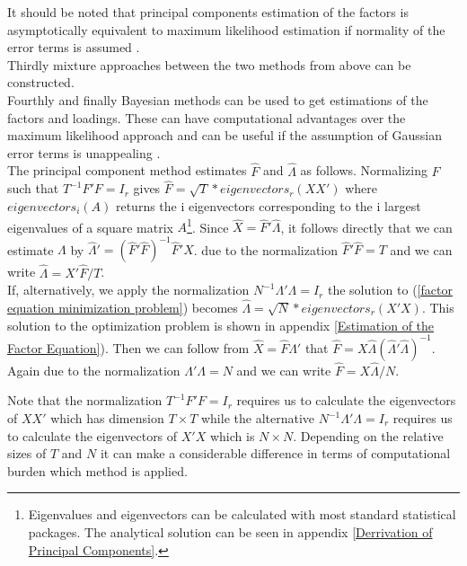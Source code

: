 \documentclass[12pt]{article}
\begin{document}
It should be noted that principal components estimation of the factors is asymptotically equivalent to maximum likelihood estimation if normality of the error terms is assumed \citep{bai2003inferential}. \\
Thirdly mixture approaches between the two methods from above can be constructed. \\
Fourthly and finally Bayesian methods can be used to get estimations of the factors and loadings. These can have computational advantages over the maximum likelihood approach and can be useful if the assumption of Gaussian error terms is unappealing \citep{stock2011dynamic}. \\

The principal component method estimates $\hat F$ and $\hat \Lambda$ as follows. Normalizing $F$ such that $T^{-1}F'F = I_r$ gives $\hat F = \sqrt{T} * eigenvectors_r(XX')$ where $eigenvectors_i(A)$ returns the i eigenvectors corresponding to the i largest eigenvalues of a square matrix $A$\footnote{Eigenvalues and eigenvectors can be calculated with most standard statistical packages. The analytical solution can be seen in appendix \ref{Derrivation of Principal Components}.}. Since $\hat X = \hat F' \hat \Lambda$, it follows directly that we can estimate $\Lambda$ by $\hat \Lambda' = (\hat F' \hat F)^{-1} \hat F'X$. due to the normalization $\hat F' \hat F = T$ and we can write $\hat \Lambda = X' \hat F / T$. \\
If, alternatively, we apply the normalization $N^{-1}\Lambda'\Lambda = I_r$ the solution to (\ref{factor equation minimization problem}) becomes $\hat \Lambda = \sqrt{N} * eigenvectors_r(X'X)$. This solution to the optimization problem is shown in appendix \ref{Estimation of the Factor Equation}). Then we can follow from $\hat X = \hat F \hat \Lambda'$ that $\hat F = X \hat \Lambda (\hat \Lambda' \hat \Lambda)^{-1}$. Again due to the normalization $\Lambda' \Lambda = N$ and we can write $\hat F = X \hat \Lambda / N$.

Note that the normalization $T^{-1}F'F = I_r$ requires us to calculate the eigenvectors of $XX'$ which has dimension $T \times T$ while the alternative $N^{-1}\Lambda'\Lambda = I_r$ requires us to calculate the eigenvectors of $X'X$ which is $N \times N$. Depending on the relative sizes of $T$ and $N$ it can make a considerable difference in terms of computational burden which method is applied. \\
\end{document}
